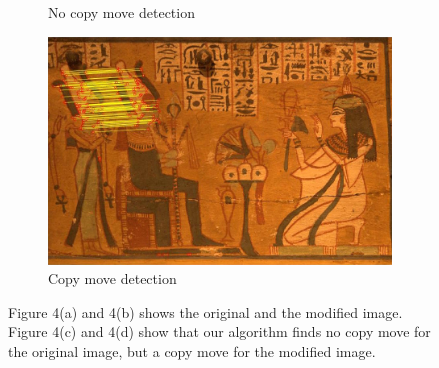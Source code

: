 \documentclass[12pt]{article}
\begin{document}
\begin{figure}
\begin{subfigure}{.5\textwidth}
  \caption{No copy move detection}
  \label{fig:sub1}
\end{subfigure}%
\begin{subfigure}{.5\textwidth}
  \centering
  \includegraphics[width=.8\linewidth]{./gfx/egyptian_result.jpg}
  \caption{Copy move detection}
  \label{fig:sub2}
\end{subfigure}
\caption{Figure 4(a) and 4(b) shows the original and the modified image. Figure 4(c) and 4(d) show that our algorithm finds no copy move for the original image, but a copy move for the modified image.}
\label{fig:test}
\end{figure}
\end{document}
